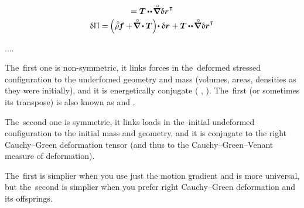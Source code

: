 \begin{equation*}
\begin{array}{c}
= \firstpiolakirchhoffstress \hspace{-0.1ex} \dotdotp \hspace{-0.2ex} \boldnablacircled \hspace{.1ex} \variation{\currentlocationvector}^{\hspace{.1ex}\T}
\\[.25em]
%
\variation{\potentialenergydensity}
= \hspace{-0.15ex} \left(^{\mathstrut} \hspace{-0.1ex} \mathcircabove{\rho} \hspace{-0.1ex} \massloadvector + \hspace{-0.25ex} \boldnablacircled \hspace{-0.1ex} \dotp \firstpiolakirchhoffstress \right) \hspace{-0.4ex} \dotp \variation{\currentlocationvector}
\hspace{.1ex}
+ \firstpiolakirchhoffstress \hspace{-0.1ex} \dotdotp \hspace{-0.2ex} \boldnablacircled \hspace{.1ex} \variation{\currentlocationvector}^{\hspace{.1ex}\T}
\end{array}
\end{equation*}

....

The~first one is non-symmetric, it links forces in the~deformed stressed configuration to the underfomed geometry and mass (volumes, areas, densities as they were initially), and it is energetically conjugate  ( ,  ).
The~first (or sometimes its transpose) is also known as  and .

The~second one is symmetric, it links loads in the~initial undeformed configuration to the initial mass and geometry, and it is conjugate to the right Cauchy\hbox{--}Green deformation tensor (and thus to the Cauchy\hbox{--}Green\hbox{--}Venant measure of deformation).

The~first is simplier when you use just the motion gradient and is more universal, but the~second is simplier when you prefer right Cauchy\hbox{--}Green deformation and its offsprings.

